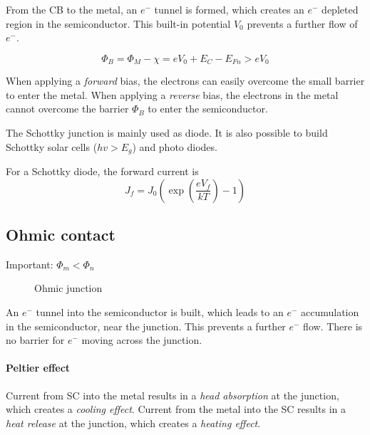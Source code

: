 From the CB to the metal, an $e^-$ tunnel is formed, which creates an $e^-$
depleted region in the semiconductor.
This built-in potential $V_0$ prevents a further flow of $e^-$.

\begin{equation}
    \Phi_B = \Phi_M - \chi = e V_0 + E_C - E_{Fn} > e V_0
\end{equation}

When applying a \emph{forward} bias, the electrons can easily overcome the small
barrier to enter the metal.
When applying a \emph{reverse} bias, the electrons in the metal cannot overcome
the barrier $\Phi_B$ to enter the semiconductor.

The Schottky junction is mainly used as diode. 
It is also possible to build Schottky solar cells ($hv>E_g$) and photo diodes.

For a Schottky diode, the forward current is
\begin{equation}
    J_f = J_0 \left( \exp\left(\frac{e V_f}{k T}\right) -1 \right)
\end{equation}

\subsection{Ohmic contact}

Important: $\Phi_m < \Phi_n$

\begin{figure}[ht!]
    \centering
    
    \caption{Ohmic junction}
\end{figure}

An $e^-$ tunnel into the semiconductor is built, which leads to an $e^-$
accumulation in the semiconductor, near the junction. 
This prevents a further $e^-$ flow. 
There is no barrier for $e^-$ moving across the junction.

\paragraph{Peltier effect}
Current from SC into the metal results in a \emph{head absorption} at the junction,
which creates a \emph{cooling effect}.
Current from the metal into the SC results in a \emph{heat release} at the junction,
which creates a \emph{heating effect}.
